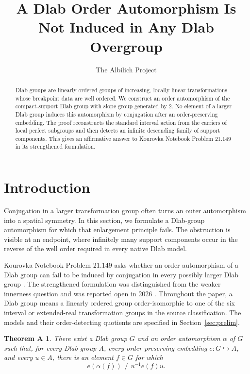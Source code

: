 \documentclass[11pt]{amsart}
\title{A Dlab Order Automorphism Is Not Induced in Any Dlab Overgroup}
\author{The Albilich Project}
\newtheorem*{theoremA}{Theorem A}
\theoremstyle{definition}
\theoremstyle{remark}
\numberwithin{equation}{section}
\begin{document}
\begin{abstract}
Dlab groups are linearly ordered groups of increasing, locally linear transformations whose breakpoint data are well ordered. We construct an order automorphism of the compact-support Dlab group with slope group generated by \(2\). No element of a larger Dlab group induces this automorphism by conjugation after an order-preserving embedding. The proof reconstructs the standard interval action from the carriers of local perfect subgroups and then detects an infinite descending family of support components. This gives an affirmative answer to Kourovka Notebook Problem 21.149 in its strengthened formulation.
\end{abstract}

\maketitle

\section{Introduction}

Conjugation in a larger transformation group often turns an outer automorphism into a spatial symmetry. In this section, we formulate a Dlab-group automorphism for which that enlargement principle fails. The obstruction is visible at an endpoint, where infinitely many support components occur in the reverse of the well order required in every native Dlab model.

Kourovka Notebook Problem 21.149 asks whether an order automorphism of a Dlab group can fail to be induced by conjugation in every possibly larger Dlab group \cite{KopytovMedvedev}. The strengthened formulation was distinguished from the weaker innerness question and was reported open in 2026 \cite{vanDoornEtAl}. Throughout the paper, a Dlab group means a linearly ordered group order-isomorphic to one of the six interval or extended-real transformation groups in the source classification. The models and their order-detecting quotients are specified in Section~\ref{sec:prelim}.

\begin{theoremA}
There exist a Dlab group \(G\) and an order automorphism \(\alpha\) of \(G\) such that, for every Dlab group \(A\), every order-preserving embedding \(e:G\hookrightarrow A\), and every \(u\in A\), there is an element \(f\in G\) for which
\[
e(\alpha(f))\ne u^{-1}e(f)u.
\]
\end{theoremA}
\end{document}
